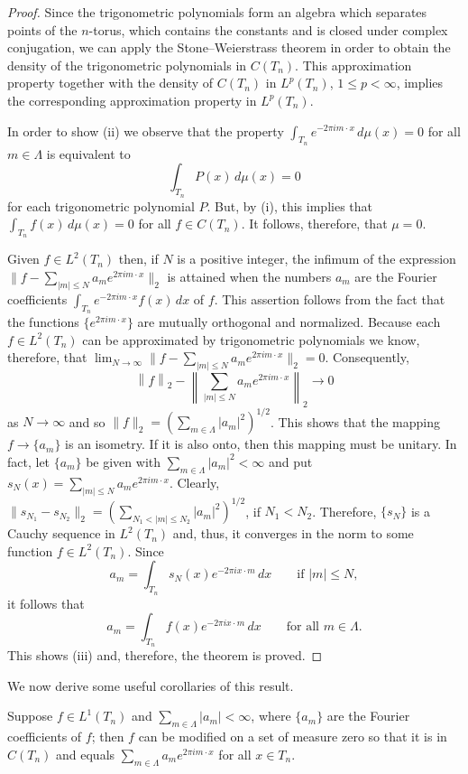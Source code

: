 \begin{proof}
Since the trigonometric polynomials form an algebra which separates points of the $n$-torus, which contains the constants and is closed under complex conjugation, we can apply the Stone--Weierstrass theorem in order to obtain the density of the trigonometric polynomials in $C(T_n)$. This approximation property together with the density of $C(T_n)$ in $L^p(T_n)$, $1 \leq p < \infty$, implies the corresponding approximation property in $L^p(T_n)$.

In order to show (ii) we observe that the property $\int_{T_n} e^{-2\pi i m \cdot x}\,d\mu(x) = 0$ for all $m \in \Lambda$ is equivalent to
\[
\int_{T_n} P(x)\,d\mu(x) = 0
\]
for each trigonometric polynomial $P$. But, by (i), this implies that $\int_{T_n} f(x)\,d\mu(x) = 0$ for all $f \in C(T_n)$. It follows, therefore, that $\mu = 0$.

Given $f \in L^2(T_n)$ then, if $N$ is a positive integer, the infimum of the expression $\|f - \sum_{|m| \leq N} a_m e^{2\pi i m \cdot x}\|_2$ is attained when the numbers $a_m$ are the Fourier coefficients $\int_{T_n} e^{-2\pi i m \cdot x} f(x)\,dx$ of $f$. This assertion follows from the fact that the functions $\{e^{2\pi i m \cdot x}\}$ are mutually orthogonal and normalized. Because each $f \in L^2(T_n)$ can be approximated by trigonometric polynomials we know, therefore, that $\lim_{N \to \infty} \|f - \sum_{|m| \leq N} a_m e^{2\pi i m \cdot x}\|_2 = 0$. Consequently,
\[
\left\|f\right\|_2 - \left\|\sum_{|m| \leq N} a_m e^{2\pi i m \cdot x}\right\|_2 \to 0
\]
as $N \to \infty$ and so $\|f\|_2 = (\sum_{m \in \Lambda} |a_m|^2)^{1/2}$. This shows that the mapping $f \to \{a_m\}$ is an isometry. If it is also onto, then this mapping must be unitary. In fact, let $\{a_m\}$ be given with $\sum_{m \in \Lambda} |a_m|^2 < \infty$ and put $s_N(x) = \sum_{|m| \leq N} a_m e^{2\pi i m \cdot x}$. Clearly, $\|s_{N_1} - s_{N_2}\|_2 = (\sum_{N_1 < |m| \leq N_2} |a_m|^2)^{1/2}$, if $N_1 < N_2$. Therefore, $\{s_N\}$ is a Cauchy sequence in $L^2(T_n)$ and, thus, it converges in the norm to some function $f \in L^2(T_n)$. Since
\[
a_m = \int_{T_n} s_N(x) e^{-2\pi i x \cdot m}\,dx \qquad \text{if } |m| \leq N,
\]
it follows that
\[
a_m = \int_{T_n} f(x) e^{-2\pi i x \cdot m}\,dx \qquad \text{for all } m \in \Lambda.
\]
This shows (iii) and, therefore, the theorem is proved.
\end{proof}

We now derive some useful corollaries of this result.

\begin{corollary}\label{cor:c7-1-8}
Suppose $f \in L^1(T_n)$ and $\sum_{m \in \Lambda} |a_m| < \infty$, where $\{a_m\}$ are the Fourier coefficients of $f$; then $f$ can be modified on a set of measure zero so that it is in $C(T_n)$ and equals $\sum_{m \in \Lambda} a_m e^{2\pi i m \cdot x}$ for all $x \in T_n$.
\end{corollary}

